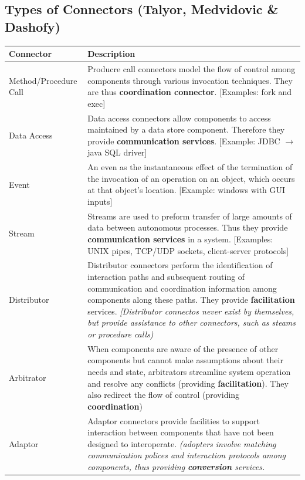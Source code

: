\documentclass[a4paper]{article}
\begin{document}
\subsection{Types of Connectors (Talyor, Medvidovic \& Dashofy)}
\begin{table}[H]
\begin{tabular}{|l|p{10cm}|}
\hline
Connector & Description\\
\hline
Method/Procedure Call & Producre call connectors model the flow of control among components through various invocation techniques. They are thus \textbf{coordination connector}. [Examples: fork and exec]\\
\hline
Data Access & Data access connectors allow components to access maintained by a data store component. Therefore they provide \textbf{communication services}. [Example: JDBC $\rightarrow$ java SQL driver]\\
\hline
Event & An even as the instantaneous effect of the termination of the invocation of an operation on an object, which occurs at that object's location. [Example: windows with GUI inputs] \\
\hline
Stream & Streams are used to preform transfer of large amounts of data between autonomous processes. Thus they provide \textbf{communication services} in a system. [Examples: UNIX pipes, TCP/UDP sockets, client-server protocols]\\
\hline
Distributor & Distributor connectors perform the identification of interaction paths and subsequent routing of communication and coordination information among components along these paths. They provide \textbf{facilitation} services. \textit{[Distributor connectos never exist by themselves, but provide assistance to other connectors, such as steams or procedure calls)}\\
\hline
Arbitrator & When components are aware of the presence of other components but cannot make assumptions about their needs and state, arbitrators streamline system operation and resolve any conflicts (providing \textbf{facilitation}). They also redirect the flow of control (providing \textbf{coordination}) \\
\hline
Adaptor & Adaptor connectors provide facilities to support interaction between components that have not been designed to interoperate. \textit{(adopters involve matching communication polices and interaction protocols among components, thus providing \textbf{conversion} services.}\\
\hline
\end{tabular}
\end{table}
\end{document}
